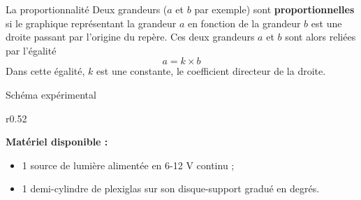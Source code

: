 \begin{doc}{La proportionnalité}
  Deux grandeurs ($a$ et $b$ par exemple) sont \textbf{proportionnelles} si le graphique représentant la grandeur $a$ en fonction de la grandeur $b$ est une droite passant par l'origine du repère.
  Ces deux grandeurs $a$ et $b$ sont alors reliées par l'égalité 
  \begin{equation*}
    a = k\times b
  \end{equation*}
  Dans cette égalité, $k$ est une constante, le coefficient directeur de la droite.
\end{doc}

\newpage
\vspace*{-36pt}
\begin{doc}{Schéma expérimental}
  \label{doc:schema_exp_disque_optique}
  \begin{wrapfigure}[2]{r}{0.52\linewidth}
    \vspace*{-54pt}
    \centering
  \end{wrapfigure}
  \textbf{Matériel disponible :}
  \begin{itemize}
    \item 1 source de lumière alimentée en 6-12 V continu ;
    \item 1 demi-cylindre de plexiglas sur son disque-support gradué en degrés.
  \end{itemize}
  \bigskip
  
  \phantom{b}
\end{doc}







